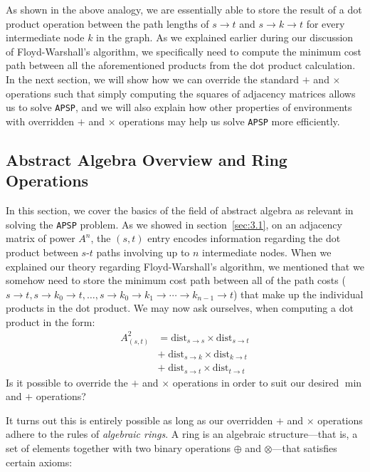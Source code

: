 \documentclass[12pt]{article}
\begin{document}
As shown in the above analogy, we are essentially able to store the result of a dot product operation between the path lengths of $s \to t$ and $s \to k \to t$ for every intermediate node $k$ in the graph. As we explained earlier during our discussion of Floyd-Warshall's algorithm, we specifically need to compute the minimum cost path between all the aforementioned products from the dot product calculation. In the next section, we will show how we can override the standard $+$ and $\times$ operations such that simply computing the squares of adjacency matrices allows us to solve \texttt{APSP}, and we will also explain how other properties of environments with overridden $+$ and $\times$ operations may help us solve \texttt{APSP} more efficiently.

\subsection{Abstract Algebra Overview and Ring Operations} \label{sec:3.2}

In this section, we cover the basics of the field of abstract algebra as relevant in solving the \texttt{APSP} problem. As we showed in section~\ref{sec:3.1}, on an adjacency matrix of power $A^n$, the $(s, t)$ entry encodes information regarding the dot product between $s$-$t$ paths involving up to $n$ intermediate nodes. When we explained our theory regarding Floyd-Warshall's algorithm, we mentioned that we somehow need to store the minimum cost path between all of the path costs ($s \to t, s \to k_0 \to t, \ldots, s \to k_0 \to k_1 \to \cdots \to k_{n - 1} \to t$) that make up the individual products in the dot product. We may now ask ourselves, when computing a dot product in the form:
\[
    \begin{split}
        A^2_{(s,t)}
        &= \mathrm{dist}_{s \to s} \times \mathrm{dist}_{s \to t} \\
        &+ \; \mathrm{dist}_{s \to k} \times \mathrm{dist}_{k \to t} \\
        &+ \; \mathrm{dist}_{s \to t} \times \mathrm{dist}_{t \to t}
    \end{split}
\]
Is it possible to override the $+$ and $\times$ operations in order to suit our desired $\min$ and $+$ operations?

It turns out this is entirely possible as long as our overridden $+$ and $\times$ operations adhere to the rules of \emph{algebraic rings}. A ring is an algebraic structure—that is, a set of elements together with two binary operations $\oplus$ and $\otimes$—that satisfies certain axioms:
\end{document}
